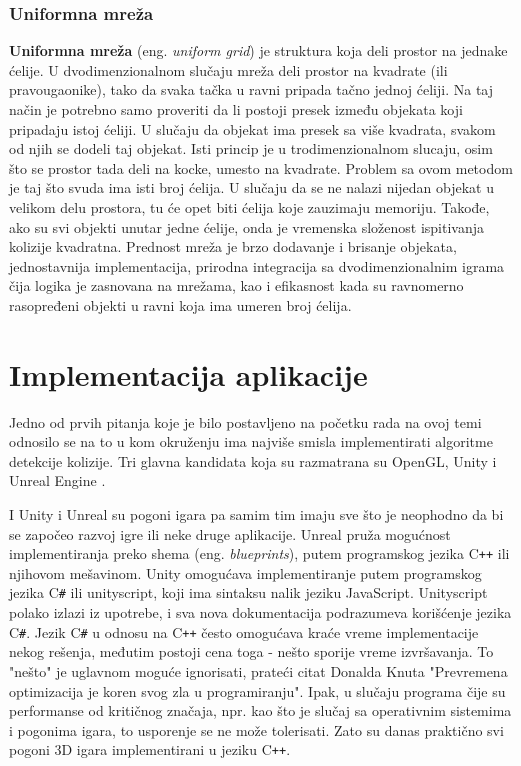 \documentclass[12pt,oneside]{memoir}
\begin{document}
\subsection{Uniformna mreža}
\label{subsec:grid}

\textbf{Uniformna mreža} (eng. {\em uniform grid}) je struktura koja deli prostor na jednake ćelije.
U dvodimenzionalnom slučaju mreža deli prostor na kvadrate (ili pravougaonike), tako da svaka tačka u ravni 
pripada tačno jednoj ćeliji.
Na taj način je potrebno samo proveriti da li postoji presek između objekata koji pripadaju istoj ćeliji.
U slučaju da objekat ima presek sa više kvadrata, svakom od njih se dodeli taj objekat.
Isti princip je u trodimenzionalnom slucaju, osim što se prostor tada deli na kocke, umesto na kvadrate. 
Problem sa ovom metodom je taj što svuda ima isti broj ćelija.
U slučaju da se ne nalazi nijedan objekat u velikom delu prostora, tu će opet biti ćelija koje zauzimaju memoriju.
Takođe, ako su svi objekti unutar jedne ćelije, onda je vremenska složenost ispitivanja kolizije kvadratna.
Prednost mreža je brzo dodavanje i brisanje objekata, jednostavnija implementacija,
prirodna integracija sa dvodimenzionalnim igrama čija logika je zasnovana na mrežama,
kao i efikasnost kada su ravnomerno rasopređeni objekti u ravni koja ima umeren broj ćelija.

\chapter{Implementacija aplikacije}
\label{sec:implementacija}

Jedno od prvih pitanja koje je bilo postavljeno na početku rada na ovoj temi odnosilo se na to 
u kom okruženju ima najviše smisla implementirati algoritme detekcije kolizije.
Tri glavna kandidata koja su razmatrana su OpenGL, Unity i Unreal Engine \cite{unreal}.

I Unity i Unreal su pogoni igara pa samim tim imaju sve što je neophodno da 
bi se započeo razvoj igre ili neke druge aplikacije.
Unreal pruža mogućnost implementiranja preko shema (eng. {\em blueprints}),
putem programskog jezika C\texttt{++} ili njihovom mešavinom.
Unity omogućava implementiranje putem programskog jezika C\texttt{\#} ili unityscript,
koji ima sintaksu nalik jeziku JavaScript. Unityscript polako izlazi iz upotrebe, i 
sva nova dokumentacija podrazumeva korišćenje jezika C\texttt{\#}.
Jezik C\texttt{\#} u odnosu na C\texttt{++} često omogućava kraće vreme implementacije nekog rešenja,
međutim postoji cena toga - nešto sporije vreme izvršavanja.
To "nešto" je uglavnom moguće ignorisati, prateći citat Donalda Knuta 
"Prevremena optimizacija je koren svog zla u programiranju".
Ipak, u slučaju programa čije su performanse od kritičnog značaja, npr. kao što je 
slučaj sa operativnim sistemima i pogonima igara, to usporenje se ne može tolerisati.
Zato su danas praktično svi pogoni 3D igara implementirani u jeziku C\texttt{++}.
\end{document}
